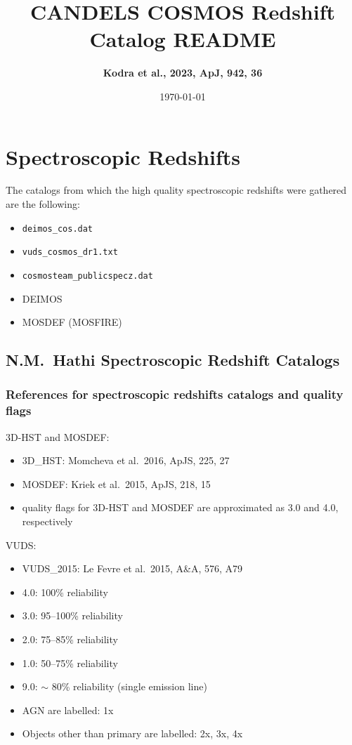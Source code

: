 \documentclass[12pt,onecolumn]{article}
\title{\textbf{CANDELS COSMOS Redshift Catalog README}}
\author{\textbf{Kodra et al., 2023, ApJ, 942, 36}}
\date{\today}
\begin{document}
\maketitle





\section*{Spectroscopic Redshifts}

The catalogs from which the high quality spectroscopic redshifts were gathered are the following:
\begin{itemize}
\item \texttt{deimos\_cos.dat}
\item \texttt{vuds\_cosmos\_dr1.txt}
\item \texttt{cosmosteam\_publicspecz.dat}
\item DEIMOS
\item MOSDEF (MOSFIRE)
\end{itemize}

\subsection*{N.M.~Hathi Spectroscopic Redshift Catalogs}
\subsubsection*{References for spectroscopic redshifts catalogs and quality flags}

\noindent 3D-HST and MOSDEF:
\begin{itemize}
\item 3D\_HST: Momcheva et al.\ 2016, ApJS, 225, 27
\item MOSDEF: Kriek et al.\ 2015, ApJS, 218, 15
\item quality flags for 3D-HST and MOSDEF are approximated as 3.0 and 4.0, respectively
\end{itemize}

\noindent VUDS:
\begin{itemize}
\item VUDS\_2015: Le Fevre et al.\ 2015, A\&A, 576, A79
\item 4.0: 100\% reliability
\item 3.0: 95--100\% reliability
\item 2.0: 75--85\% reliability
\item 1.0: 50--75\% reliability
\item 9.0: $\sim$ 80\% reliability (single emission line)
\item AGN are labelled: 1x
\item Objects other than primary are labelled: 2x, 3x, 4x
\end{itemize}
\end{document}
